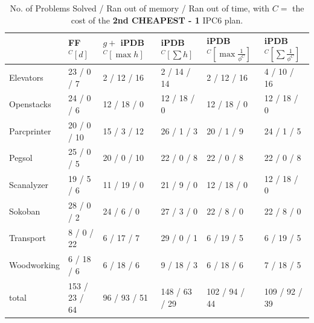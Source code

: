 \documentclass[letterpaper]{article} %
\begin{document}
\begin{table}
\caption{No. of Problems Solved / Ran out of memory / Ran out of time,
with \(C =\) the cost of the \textbf{2nd CHEAPEST - 1} IPC6 plan.}
\label{tab:resultsSecondBest}
\begin{tabular}{| l | l | l | l | l | l |}
\hline
             & FF\(^C[d]\)      & \(g + \) iPDB\(^C[\max{h}]\)    & iPDB\(^C[\sum{h}]\) &  iPDB\(^C[\max \frac{1}{\phi^C}]\) & iPDB\(^C[\sum \frac{1}{\phi^C}]\) \\
\hline
Elevators    & 23 / 0 / 7     & 2 / 12 / 16     & 2 / 14 / 14     & 2 / 12 / 16       & 4 / 10 / 16        \\
Openstacks   & 24 / 0 / 6     & 12 / 18 / 0     & 12 / 18 / 0     & 12 / 18 / 0       & 12 / 18 / 0       \\
Parcprinter  & 20 / 0 / 10    & 15 / 3 / 12     & 26 / 1 / 3      & 20 / 1 / 9        & 24 / 1 / 5         \\
Pegsol       & 25 / 0 / 5     & 20 / 0 / 10     & 22 / 0 / 8      & 22 / 0 / 8        & 22 / 0 / 8        \\
Scanalyzer   & 19 / 5 / 6     & 11 / 19 / 0     & 21 / 9 / 0      & 12 / 18 / 0       & 12 / 18 / 0       \\ 
Sokoban      & 28 / 0 / 2     & 24 / 6 / 0      & 27 / 3 / 0      & 22 / 8 / 0        & 22 / 8 / 0        \\
Transport    & 8 / 0 / 22     & 6 / 17 / 7      & 29 / 0 / 1      & 6 / 19 / 5        & 6 / 19 / 5        \\ 
Woodworking  & 6 / 18 / 6     & 6 / 18 / 6      & 9 / 18 / 3      & 6 / 18 / 6        & 7 / 18 / 5        \\
\hline
total        & 153 / 23 / 64  & 96 / 93 / 51    & 148 / 63 / 29   & 102 / 94 / 44     & 109 / 92 / 39     \\
\hline
\end{tabular}


\end{table}
\end{document}
